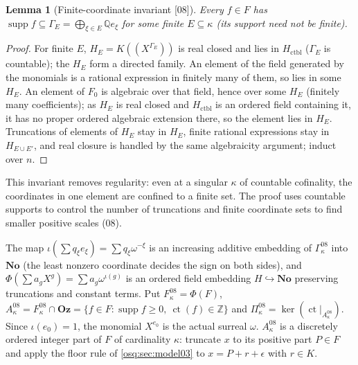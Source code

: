 \documentclass[11pt,letterpaper]{article}
\numberwithin{equation}{section}
\newtheorem{lemma}[lemma]{Lemma}
\theoremstyle{definition}
\theoremstyle{remark}
\theoremstyle{plain}
\newcommand{\No}{\mathbf{No}}
\newcommand{\Oz}{\mathbf{Oz}}
\newcommand{\Z}{\mathbb Z}
\newcommand{\Q}{\mathbb Q}
\newcommand{\hahn}[2]{#1(\!(X^{#2})\!)}
\newcommand{\ct}{\operatorname{ct}}
\newcommand{\supp}{\operatorname{supp}}
\newcommand{\src}[1]{\textup{\textsf{[#1]}}}
\begin{document}
\begin{lemma}[Finite-coordinate invariant \src{08}]\label{osq:lem:finitecoord}
Every $f\in F$ has $\supp f\subseteq\Gamma_E=\bigoplus_{\xi\in E}\Q e_\xi$ for some finite $E\subseteq\kappa$
(its support need not be finite).
\end{lemma}
\begin{proof}
For finite $E$, $H_E=\hahn K{\Gamma_E}$ is real closed and lies in $H_{\mathrm{ctbl}}$ ($\Gamma_E$ is
countable); the $H_E$ form a directed family. An element of the field generated by the monomials is a
rational expression in finitely many of them, so lies in some $H_E$. An element of $F_0$ is algebraic over
that field, hence over some $H_E$ (finitely many coefficients); as $H_E$ is real closed and
$H_{\mathrm{ctbl}}$ is an ordered field containing it, it has no proper ordered algebraic extension there,
so the element lies in $H_E$. Truncations of elements of $H_E$ stay in $H_E$, finite rational expressions
stay in $H_{E\cup E'}$, and real closure is handled by the same algebraicity argument; induct over $n$.
\end{proof}

This invariant removes regularity: even at a singular $\kappa$ of countable cofinality, the coordinates in
one element are confined to a finite set. The proof uses countable supports to control the number of
truncations and finite coordinate sets to find smaller positive scales (08).

The map $\iota(\sum q_\xi e_\xi)=\sum q_\xi\omega^{-\xi}$ is an increasing additive embedding of
$\Gamma^{08}_\kappa$ into $\No$ (the least nonzero coordinate decides the sign on both sides), and
$\Phi(\sum a_gX^g)=\sum a_g\omega^{\iota(g)}$ is an ordered field embedding $H\hookrightarrow\No$
preserving truncations and constant terms. Put $F^{08}_\kappa=\Phi(F)$,
$A^{08}_\kappa=F^{08}_\kappa\cap\Oz=\{f\in F:\supp f\ge0,\ \ct(f)\in\Z\}$ and
$\Pi^{08}_\kappa=\ker(\ct|_{A^{08}_\kappa})$. Since $\iota(e_0)=1$, the monomial $X^{e_0}$ is the actual
surreal $\omega$. $A^{08}_\kappa$ is a discretely ordered integer part of $F$ of cardinality $\kappa$:
truncate $x$ to its positive part $P\in F$ and apply the floor rule of \cref{osq:sec:model03} to
$x=P+r+\epsilon$ with $r\in K$.
\end{document}
